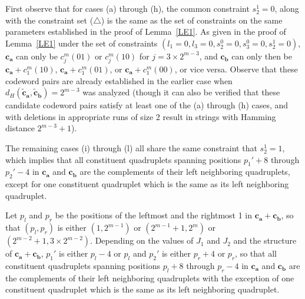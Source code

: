 First observe that for cases (a) through (h), the common
constraint $s_2^1 = 0$, along with the constraint set
($\triangle$) is the same as the set of constraints on the same
parameters established in the proof of Lemma~\ref{LE1}. As given
in the proof of Lemma~\ref{LE1} under the set of constraints
$(l_1=0, l_3=0, s_2^0=0,s_3^0=0,s_2^1=0)$, $\mathbf{c_a}$ can only
be $c_j^m(01)$ or $c_j^m(10)$ for $j=3\times 2^{m-3}$, and
$\mathbf{c_b}$ can only then be $\mathbf{c_a}+c_1^m(10)$,
$\mathbf{c_a}+c_1^m(01)$, or $\mathbf{c_a}+c_1^m(00)$, or vice
versa. Observe that these codeword pairs are already established
in the earlier case when
$d_H(\mathbf{\tilde{c}_a},\mathbf{\tilde{c}_b})=2^{m-3}$ was
analyzed (though it can also be verified that these candidate
codeword pairs satisfy at least one of the (a) through (h) cases,
and with deletions in appropriate runs of size 2 result in strings
with Hamming distance $2^{m-3}+1$).




The remaining cases (i) through (l) all share the same constraint
that $s_2^1 = 1$, which implies that all constituent quadruplets
spanning positions $p_1'+8$ through $p_2'-4$ in $\mathbf{c_a}$ and
$\mathbf{c_b}$ are the complements of their left neighboring
quadruplets, except for one constituent quadruplet which is the
same as its left neighboring quadruplet.

Let $p_l$ and $p_r$ be the positions of the leftmost and the
rightmost 1 in $\mathbf{c_a}+\mathbf{c_b}$, so that $(p_l,p_r)$ is
either $(1,2^{m-1})$ or $(2^{m-1}+1,2^m)$ or $(2^{m-2}+1,3 \times
2^{m-2})$. Depending on the values of $J_1$ and $J_2$ and the
structure of $\mathbf{c_a}+\mathbf{c_b}$, $p_1'$ is either $p_l-4$
or $p_l$ and $p_2'$ is either $p_r+4$ or $p_r$, so that all
constituent quadruplets spanning positions $p_l+8$ through $p_r-4$
in $\mathbf{c_a}$ and $\mathbf{c_b}$ are the complements of their
left neighboring quadruplets with the exception of one constituent
quadruplet which is the same as its left neighboring quadruplet.

